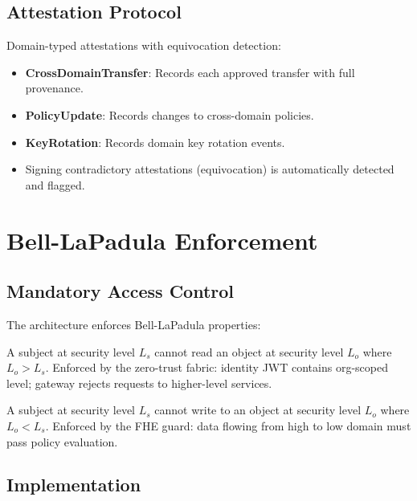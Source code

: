 \documentclass[11pt,letterpaper]{article}
\begin{document}
\subsection{Attestation Protocol}

Domain-typed attestations with equivocation detection:

\begin{itemize}
\item \textbf{CrossDomainTransfer}: Records each approved transfer with full provenance.
\item \textbf{PolicyUpdate}: Records changes to cross-domain policies.
\item \textbf{KeyRotation}: Records domain key rotation events.
\item Signing contradictory attestations (equivocation) is automatically detected and flagged.
\end{itemize}

\section{Bell-LaPadula Enforcement}

\subsection{Mandatory Access Control}

The architecture enforces Bell-LaPadula properties:

\begin{definition}
A subject at security level $L_s$ cannot read an object at security level $L_o$ where $L_o > L_s$. Enforced by the zero-trust fabric: identity JWT contains org-scoped level; gateway rejects requests to higher-level services.
\end{definition}

\begin{definition}
A subject at security level $L_s$ cannot write to an object at security level $L_o$ where $L_o < L_s$. Enforced by the FHE guard: data flowing from high to low domain must pass policy evaluation.
\end{definition}

\subsection{Implementation}
\end{document}

